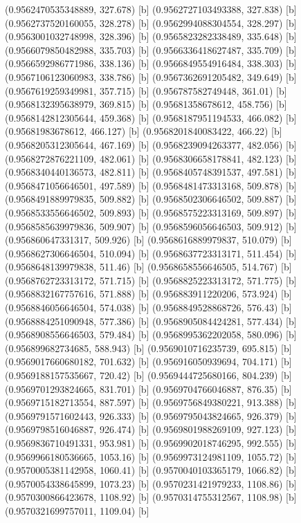 {{{(0.9562470535348889, 327.678) [b] 
(0.9562727103493388, 327.838) [b] 
(0.9562737520160055, 328.278) [b] 
(0.9562994088304554, 328.297) [b] 
(0.9563001032748998, 328.396) [b] 
(0.9565823282338489, 335.648) [b] 
(0.9566079850482988, 335.703) [b] 
(0.9566336418627487, 335.709) [b] 
(0.9566592986771986, 338.136) [b] 
(0.9566849554916484, 338.303) [b] 
(0.9567106123060983, 338.786) [b] 
(0.9567362691205482, 349.649) [b] 
(0.9567619259349981, 357.715) [b] 
(0.956787582749448, 361.01) [b] 
(0.9568132395638979, 369.815) [b] 
(0.95681358678612, 458.756) [b] 
(0.9568142812305644, 459.368) [b] 
(0.9568187951194533, 466.082) [b] 
(0.95681983678612, 466.127) [b] 
(0.9568201840083422, 466.22) [b] 
(0.9568205312305644, 467.169) [b] 
(0.9568239094263377, 482.056) [b] 
(0.9568272876221109, 482.061) [b] 
(0.9568306658178841, 482.123) [b] 
(0.9568340440136573, 482.811) [b] 
(0.9568405748391537, 497.581) [b] 
(0.9568471056646501, 497.589) [b] 
(0.9568481473313168, 509.878) [b] 
(0.9568491889979835, 509.882) [b] 
(0.9568502306646502, 509.887) [b] 
(0.9568533556646502, 509.893) [b] 
(0.9568575223313169, 509.897) [b] 
(0.9568585639979836, 509.907) [b] 
(0.9568596056646503, 509.912) [b] 
(0.956860647331317, 509.926) [b] 
(0.9568616889979837, 510.079) [b] 
(0.9568627306646504, 510.094) [b] 
(0.9568637723313171, 511.454) [b] 
(0.9568648139979838, 511.46) [b] 
(0.9568658556646505, 514.767) [b] 
(0.9568762723313172, 571.715) [b] 
(0.9568825223313172, 571.775) [b] 
(0.9568832167757616, 571.888) [b] 
(0.956883911220206, 573.924) [b] 
(0.9568846056646504, 574.038) [b] 
(0.9568849528868726, 576.43) [b] 
(0.9568884251090948, 577.386) [b] 
(0.9568905084424281, 577.434) [b] 
(0.9568908556646503, 579.484) [b] 
(0.9568995362202058, 580.096) [b] 
(0.956899682734685, 588.943) [b] 
(0.9569010716235739, 695.815) [b] 
(0.9569017660680182, 701.632) [b] 
(0.956916050939694, 704.171) [b] 
(0.9569188157535667, 720.42) [b] 
(0.9569444725680166, 804.239) [b] 
(0.9569701293824665, 831.701) [b] 
(0.9569704766046887, 876.35) [b] 
(0.9569715182713554, 887.597) [b] 
(0.9569756849380221, 913.388) [b] 
(0.9569791571602443, 926.333) [b] 
(0.9569795043824665, 926.379) [b] 
(0.9569798516046887, 926.474) [b] 
(0.9569801988269109, 927.123) [b] 
(0.9569836710491331, 953.981) [b] 
(0.9569902018746295, 992.555) [b] 
(0.9569966180536665, 1053.16) [b] 
(0.9569973124981109, 1055.72) [b] 
(0.9570005381142958, 1060.41) [b] 
(0.9570040103365179, 1066.82) [b] 
(0.9570054338645899, 1073.23) [b] 
(0.9570231421979233, 1108.86) [b] 
(0.9570300866423678, 1108.92) [b] 
(0.9570314755312567, 1108.98) [b] 
(0.9570321699757011, 1109.04) [b] 
}}}
